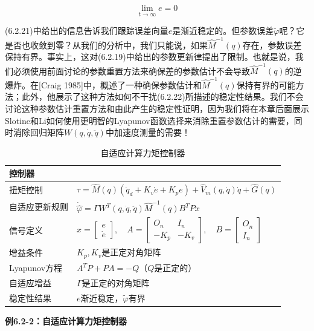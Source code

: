 \documentclass[12pt,a4paper]{ctexart}
\begin{document}
\begin{equation}\label{eq:6.2.21}
\lim_{t \to \infty} e = 0
\end{equation}

(6.2.21)中给出的信息告诉我们跟踪误差向量$e$是渐近稳定的。但参数误差$\tilde{\varphi}$呢？它是否也收敛到零？从我们的分析中，我们只能说，如果$\hat{M}^{-1}(q)$存在，参数误差保持有界。事实上，这对(6.2.19)中给出的参数更新律提出了限制。也就是说，我们必须使用前面讨论的参数重置方法来确保差的参数估计不会导致$\hat{M}^{-1}(q)$的逆爆炸。在[Craig 1985]中，概述了一种确保参数估计和$\hat{M}^{-1}(q)$保持有界的可能方法；此外，他展示了这种方法如何不干扰(6.2.22)所描述的稳定性结果。我们不会讨论这种参数估计重置方法和由此产生的稳定性证明，因为我们将在本章后面展示Slotine和Li如何使用更明智的Lyapunov函数选择来消除重置参数估计的需要，同时消除回归矩阵$W(q, \dot{q}, \ddot{q})$中加速度测量的需要！

\begin{table}[H]
\centering
\caption{自适应计算力矩控制器}
\begin{tabular}{|l|l|}
\hline
\textbf{控制器} & \\ \hline
扭矩控制 & $\tau = \hat{M}(q)(\ddot{q}_d + K_v \dot{e} + K_p e) + \hat{V}_m(q, \dot{q})\dot{q} + \hat{G}(q)$ \\ \hline
自适应更新规则 & $\dot{\hat{\varphi}} = \Gamma W^T(q, \dot{q}, \ddot{q}) \hat{M}^{-1}(q) B^T P x$ \\ \hline
信号定义 & $x = \begin{bmatrix} e \\ \dot{e} \end{bmatrix}, \quad A = \begin{bmatrix} O_n & I_n \\ -K_p & -K_v \end{bmatrix}, \quad B = \begin{bmatrix} O_n \\ I_n \end{bmatrix}$ \\ \hline
增益条件 & $K_p, K_v$是正定对角矩阵 \\ \hline
Lyapunov方程 & $A^T P + PA = -Q$（$Q$是正定的） \\ \hline
自适应增益 & $\Gamma$是正定的对角矩阵 \\ \hline
稳定性结果 & $e$渐近稳定，$\tilde{\varphi}$有界 \\ \hline
\end{tabular}
\end{table}

\textbf{例6.2-2：自适应计算力矩控制器}
\end{document}

